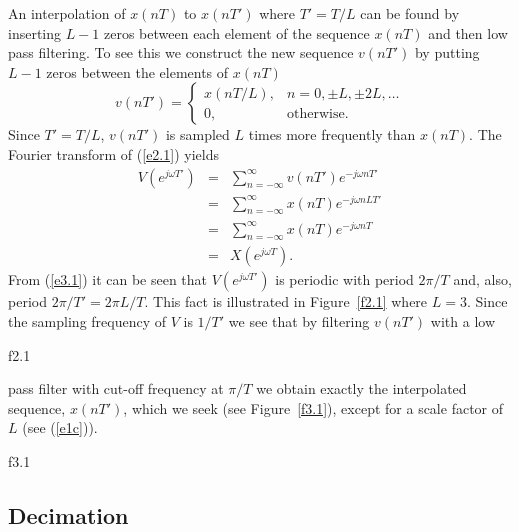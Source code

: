 	An interpolation of $x(nT)$ to $x(nT')$ where $T'=T/L$
can be found by inserting $L-1$ zeros between each element of the
sequence $x(nT)$ and then low pass filtering.  To see this we construct
the new sequence $v(nT')$ by putting $L-1$ zeros between the 
elements of $x(nT)$
%
\begin{equation}
v(nT')=\left\{ \begin{array}{ll}
                     x(nT/L), & \mbox{$n=0,\pm L,\pm 2L,\ldots$}\\
                     0, & \mbox{otherwise}.
                \end{array}
       \right.
\label{e2.1}
\end{equation}
%
Since $T'=T/L$, $v(nT')$ is sampled $L$ times more frequently than 
$x(nT)$.  The Fourier transform of (\ref{e2.1}) yields
%
\begin{eqnarray}
V(e^{j\omega T'}) 
         &=& \sum_{n=-\infty}^{\infty}v(nT')e^{-j\omega nT'}\nonumber\\
         &=& \sum_{n=-\infty}^{\infty}x(nT)e^{-j\omega nLT'}\nonumber\\
         &=& \sum_{n=-\infty}^{\infty}x(nT)e^{-j\omega nT}\nonumber\\
                  &=& X(e^{j\omega T}).
\label{e3.1}
\end{eqnarray}
%
From (\ref{e3.1}) it can be seen that $V(e^{j\omega T'})$ is periodic with
period $2\pi/T$ and, also, period $2\pi/T'=2\pi L/T$.  This fact is 
illustrated in Figure~\ref{f2.1} where $L=3$.  Since the sampling frequency of 
$V$ is $1/T'$ we see that by filtering $v(nT')$ with a low
%

{f2.1}

%
pass filter with cut-off frequency at $\pi/T$ we obtain
exactly the interpolated sequence, $x(nT')$, which we seek
(see Figure~\ref{f3.1}), except for a scale factor of $L$ (see (\ref{e1c})).
%

{f3.1}

%

\subsection{Decimation}


